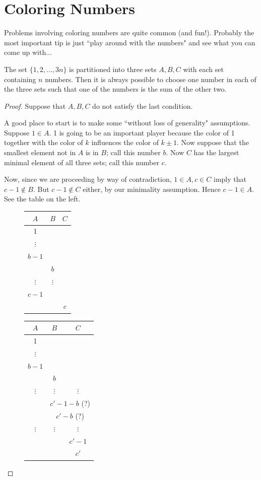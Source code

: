 \section{Coloring Numbers}
Problems involving coloring numbers are quite common (and fun!). Probably the most important tip is just ``play around with the numbers" and see what you can come up with...

\begin{ex}
The set $\{1,2,\ldots, 3n\}$ is partitioned into three sets $A,B,C$ with each set containing $n$ numbers. Then it is always possible to choose one number in each of the three sets such that one of the numbers is the sum of the other two.
\end{ex}
\begin{proof}
Suppose that $A,B,C$ do not satisfy the last condition.

A good place to start is to make some ``without loss of generality" assumptions. Suppose $1\in A$. 1 is going to be an important player because the color of 1 together with the color of $k$ influences the color of $k\pm 1$. Now suppose that the smallest element not in $A$ is in $B$; call this number $b$. Now $C$ has the largest minimal element of all three sets; call this number $c$.

Now, since we are proceeding by way of contradiction, $1\in A, c\in C$ imply that $c-1\nin B$. But $c-1\nin C$ either, by our minimality assumption. Hence $c-1\in A$. See the table on the left.

\begin{figure}[h!]\centering
\begin{tabular}{|c|c|c|}
\hline 
$A$ & $B$ & $C$\tabularnewline
\hline 
1 &  & \tabularnewline
\hline 
$\vdots$ &  & \tabularnewline
\hline 
$b-1$ &  & \tabularnewline
\hline 
 & $b$ & \tabularnewline
\hline 
$\vdots$ & $\vdots$ & \tabularnewline
\hline 
$c-1$ &  & \tabularnewline
\hline 
 &  & $c$\tabularnewline
\hline
\end{tabular}
\qquad
\begin{tabular}{|c|c|c|}
\hline 
$A$ & $B$ & $C$\tabularnewline
\hline 
1 &  & \tabularnewline
\hline 
$\vdots$ &  & \tabularnewline
\hline 
$b-1$ &  & \tabularnewline
\hline 
 & $b$ & \tabularnewline
\hline 
$\vdots$ & $\vdots$ & $\vdots$\tabularnewline
\hline 
 & \multicolumn{2}{c|}{$c'-1-b$ (?)}\tabularnewline
\hline 
 & \multicolumn{2}{c|}{$c'-b$ (?)}\tabularnewline
\hline 
$\vdots$ & $\vdots$ & $\vdots$\tabularnewline
\hline 
 &  & $c'-1$\tabularnewline
\hline 
 &  & $c'$\tabularnewline
\hline
\end{tabular}
\end{figure}


\end{proof}
